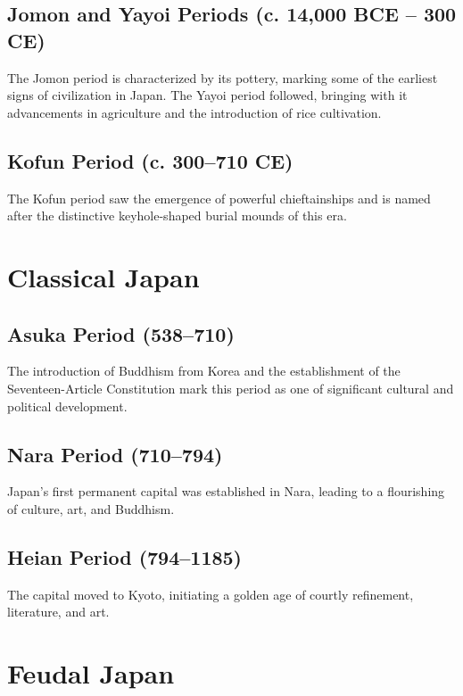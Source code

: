 \documentclass[a4paper,12pt]{book}
\begin{document}
\subsection{Jomon and Yayoi Periods (c. 14,000 BCE – 300 CE)}
\label{subsec:jomon-yayoi-periods}
The Jomon period is characterized by its pottery, marking some of the earliest signs of civilization in Japan. The Yayoi period followed, bringing with it advancements in agriculture and the introduction of rice cultivation.

\subsection{Kofun Period (c. 300–710 CE)}
\label{subsec:kofun-period}
The Kofun period saw the emergence of powerful chieftainships and is named after the distinctive keyhole-shaped burial mounds of this era.

\section{Classical Japan}
\label{sec:classical-japan}

\subsection{Asuka Period (538–710)}
\label{subsec:asuka-period}
The introduction of Buddhism from Korea and the establishment of the Seventeen-Article Constitution mark this period as one of significant cultural and political development.

\subsection{Nara Period (710–794)}
\label{subsec:nara-period}
Japan's first permanent capital was established in Nara, leading to a flourishing of culture, art, and Buddhism.

\subsection{Heian Period (794–1185)}
\label{subsec:heian-period}
The capital moved to Kyoto, initiating a golden age of courtly refinement, literature, and art.

\section{Feudal Japan}
\label{sec:feudal-japan}
\end{document}
